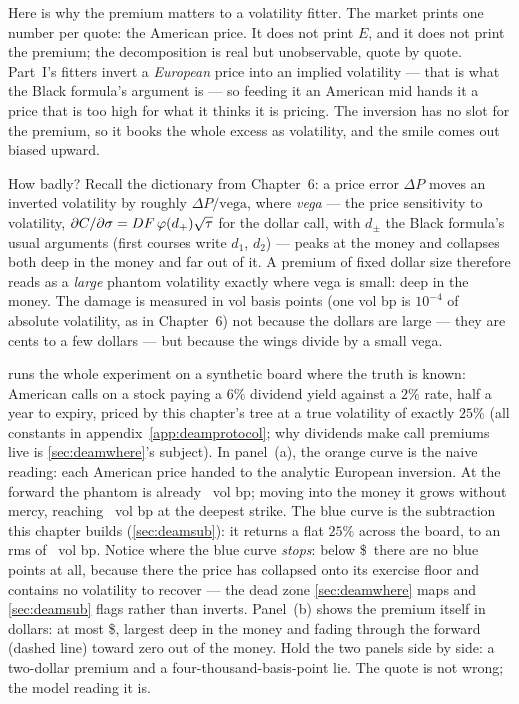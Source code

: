 Here is why the premium matters to a volatility fitter.  The market
prints one number per quote: the American price.  It does not print
$E$, and it does not print the premium; the decomposition is real but
unobservable, quote by quote.  Part~I's fitters invert a
\emph{European} price into an implied volatility --- that is what the
Black formula's argument is --- so feeding it an American mid hands it
a price that is too high for what it thinks it is pricing.  The
inversion has no slot for the premium, so it books the whole excess as
volatility, and the smile comes out biased upward.

How badly?  Recall the dictionary from Chapter~6: a price error
$\Delta P$ moves an inverted volatility by roughly $\Delta
P/\text{vega}$, where \emph{vega} --- the price sensitivity to
volatility, $\partial C/\partial\sigma = DF\,\varphi(d_+)\sqrt{\tau}$
for the dollar call, with $d_\pm$ the Black formula's usual arguments
(first courses write $d_1$, $d_2$) --- peaks at the money and
collapses both deep in the money and far out of it.  A premium of fixed dollar size therefore
reads as a \emph{large} phantom volatility exactly where vega is
small: deep in the money.  The damage is measured in vol basis points
(one vol bp is $10^{-4}$ of absolute volatility, as in Chapter~6) not
because the dollars are large --- they are cents to a few dollars ---
but because the wings divide by a small vega.

 runs the whole experiment on a synthetic board
where the truth is known: American calls on a stock paying a $6\%$
dividend yield against a $2\%$ rate, half a year to expiry, priced by
this chapter's tree at a true volatility of exactly $25\%$ (all
constants in appendix~\ref{app:deamprotocol}; why dividends make call
premiums live is \cref{sec:deamwhere}'s subject).  In panel~(a), the
orange curve is the naive reading: each American price handed to the
analytic European inversion.  At the forward the phantom is already
\MacDeamWedgeAtmBiasBp\ vol bp; moving into the money it grows without
mercy, reaching \MacDeamWedgeMaxBiasBp\ vol bp at the deepest strike.
The blue curve is the subtraction this chapter builds
(\cref{sec:deamsub}): it returns a flat $25\%$ across the board, to an
rms of \MacDeamWedgeRootRmsBp\ vol bp.  Notice where the blue curve
\emph{stops}: below \$\MacDeamMapCallBdryPct\ there are no blue points
at all, because
there the price has collapsed onto its exercise floor and contains no
volatility to recover --- the dead zone \cref{sec:deamwhere} maps and
\cref{sec:deamsub} flags rather than inverts.  Panel~(b) shows the premium
itself in dollars: at most \$\MacDeamWedgeMaxPremiumDollars, largest
deep in the money and fading through the forward (dashed line) toward
zero out of the money.  Hold the two panels side by side: a two-dollar
premium and a four-thousand-basis-point lie.  The quote is not wrong;
the model reading it is.

